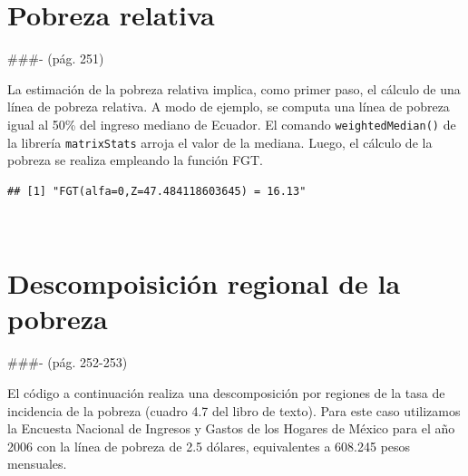 \documentclass[
]{book}
\newenvironment{Shaded}{\begin{snugshade}}{\end{snugshade}}
\newcommand{\AttributeTok}[1]{\textcolor[rgb]{0.77,0.63,0.00}{#1}}
\newcommand{\CommentTok}[1]{\textcolor[rgb]{0.56,0.35,0.01}{\textit{#1}}}
\newcommand{\DecValTok}[1]{\textcolor[rgb]{0.00,0.00,0.81}{#1}}
\newcommand{\FloatTok}[1]{\textcolor[rgb]{0.00,0.00,0.81}{#1}}
\newcommand{\FunctionTok}[1]{\textcolor[rgb]{0.00,0.00,0.00}{#1}}
\newcommand{\NormalTok}[1]{#1}
\newcommand{\OtherTok}[1]{\textcolor[rgb]{0.56,0.35,0.01}{#1}}
\newcommand{\SpecialCharTok}[1]{\textcolor[rgb]{0.00,0.00,0.00}{#1}}
\newcommand{\StringTok}[1]{\textcolor[rgb]{0.31,0.60,0.02}{#1}}
\begin{document}
\hypertarget{pobreza-relativa}{%
\section{Pobreza relativa}\label{pobreza-relativa}}

\#\#\#- (pág. 251)

La estimación de la pobreza relativa implica, como primer paso, el cálculo de una línea de pobreza relativa. A modo de ejemplo, se computa una línea de pobreza igual al 50\% del ingreso mediano de Ecuador. El comando \texttt{weightedMedian()} de la librería \texttt{matrixStats} arroja el valor de la mediana. Luego, el cálculo de la pobreza se realiza empleando la función FGT.

\begin{Shaded}
\end{Shaded}

\begin{verbatim}
## [1] "FGT(alfa=0,Z=47.484118603645) = 16.13"
\end{verbatim}

~

\hypertarget{descompoisiciuxf3n-regional-de-la-pobreza}{%
\section{Descompoisición regional de la pobreza}\label{descompoisiciuxf3n-regional-de-la-pobreza}}

\#\#\#- (pág. 252-253)

El código a continuación realiza una descomposición por regiones de la tasa de incidencia de la pobreza (cuadro 4.7 del libro de texto). Para este caso utilizamos la Encuesta Nacional de Ingresos y Gastos de los Hogares de México para el año 2006 con la línea de pobreza de 2.5 dólares, equivalentes a 608.245 pesos mensuales.
\end{document}
